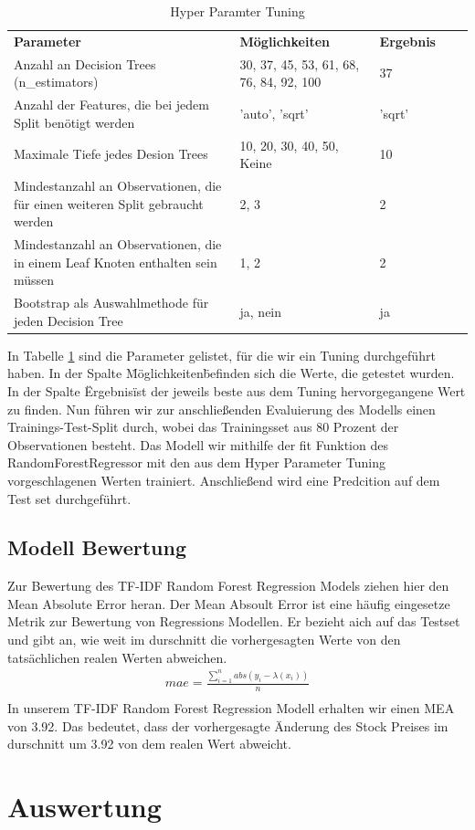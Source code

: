 \begin{table}[]

\begin{tabular}{|m{20em}|m{10em}|m{5em}|ll}
\cline{1-3}
\textbf{Parameter} & \textbf{Möglichkeiten} & \textbf{Ergebnis} &  &  \\ \cline{1-3}
 Anzahl an Decision Trees (n\_estimators)  & 30, 37, 45, 53, 61, 68, 76, 84, 92, 100 &  37 &  &  \\ \cline{1-3}
 Anzahl der Features, die bei jedem Split benötigt werden   &  'auto', 'sqrt' & 'sqrt' &  &  \\ \cline{1-3}
 Maximale Tiefe jedes Desion Trees & 10, 20, 30, 40, 50, Keine &10 &  &  \\ \cline{1-3}
 Mindestanzahl an Observationen, die für einen weiteren Split gebraucht werden &2, 3 & 2 &  &  \\ \cline{1-3}
Mindestanzahl an Observationen, die in einem Leaf Knoten enthalten sein müssen &1, 2 &2&  &  \\ \cline{1-3}
Bootstrap als Auswahlmethode für jeden Decision Tree &ja, nein &ja&  &  \\ \cline{1-3}
\end{tabular}
\caption{Hyper Paramter Tuning}
\label{fig:hpt}
\end{table}
In Tabelle \ref{fig:hpt} sind die Parameter gelistet, für die wir ein Tuning durchgeführt haben. In der Spalte \"Möglichkeiten\" befinden sich die Werte, die getestet wurden. In der Spalte \"Ergebnis\" ist der jeweils beste aus dem Tuning hervorgegangene Wert zu finden.
Nun führen wir zur anschließenden Evaluierung des Modells einen Trainings-Test-Split durch, wobei das Trainingsset aus 80 Prozent der Observationen besteht. Das Modell wir mithilfe der fit Funktion des RandomForestRegressor mit den aus dem Hyper Parameter Tuning vorgeschlagenen Werten trainiert. Anschließend wird eine Predcition auf dem Test set durchgeführt. 
\subsection{Modell Bewertung}
Zur Bewertung des TF-IDF Random Forest Regression Models ziehen hier den Mean Absolute Error heran. Der Mean Absoult Error ist eine häufig eingesetze Metrik zur Bewertung von Regressions Modellen. Er bezieht aich auf das Testset und gibt an, wie weit im durschnitt die vorhergesagten Werte von den tatsächlichen realen Werten abweichen.
\begin{align}
    mae = \frac{{\sum \nolimits _{i=1}^{n}}abs\left ({y}_{i} - \lambda ({x}_{i})\right )} {n}\\
\end{align}
In unserem TF-IDF Random Forest Regression Modell erhalten wir einen MEA von 3.92. Das bedeutet, dass der vorhergesagte Änderung des Stock Preises im durschnitt um 3.92 von dem realen Wert abweicht. 

\section{Auswertung}